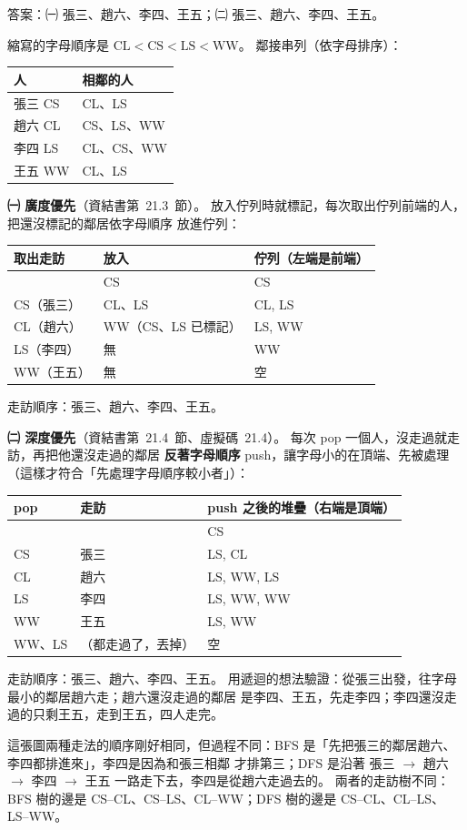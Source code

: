 \begin{pastsoln}
答案：㈠ 張三、趙六、李四、王五；㈡ 張三、趙六、李四、王五。

縮寫的字母順序是 $\mathrm{CL} < \mathrm{CS} < \mathrm{LS} < \mathrm{WW}$。 鄰接串列（依字母排序）：
\begin{center}
\begin{tabular}{ll}
\toprule
人 & 相鄰的人 \\
\midrule
張三 CS & CL、LS \\
趙六 CL & CS、LS、WW \\
李四 LS & CL、CS、WW \\
王五 WW & CL、LS \\
\bottomrule
\end{tabular}
\end{center}

\textbf{㈠ 廣度優先}（資結書第~21.3~節）。 放入佇列時就標記，每次取出佇列前端的人，把還沒標記的鄰居依字母順序
放進佇列：
\begin{center}
\begin{tabular}{lll}
\toprule
取出走訪 & 放入 & 佇列（左端是前端） \\
\midrule
& CS & CS \\
CS（張三） & CL、LS & CL, LS \\
CL（趙六） & WW（CS、LS 已標記） & LS, WW \\
LS（李四） & 無 & WW \\
WW（王五） & 無 & 空 \\
\bottomrule
\end{tabular}
\end{center}
走訪順序：張三、趙六、李四、王五。

\textbf{㈡ 深度優先}（資結書第~21.4~節、虛擬碼~21.4）。 每次 pop 一個人，沒走過就走訪，再把他還沒走過的鄰居
\textbf{反著字母順序} push，讓字母小的在頂端、先被處理（這樣才符合「先處理字母順序較小者」）：
\begin{center}
\begin{tabular}{lll}
\toprule
pop & 走訪 & push 之後的堆疊（右端是頂端） \\
\midrule
& & CS \\
CS & 張三 & LS, CL \\
CL & 趙六 & LS, WW, LS \\
LS & 李四 & LS, WW, WW \\
WW & 王五 & LS, WW \\
WW、LS & （都走過了，丟掉） & 空 \\
\bottomrule
\end{tabular}
\end{center}
走訪順序：張三、趙六、李四、王五。 用遞迴的想法驗證：從張三出發，往字母最小的鄰居趙六走；趙六還沒走過的鄰居
是李四、王五，先走李四；李四還沒走過的只剩王五，走到王五，四人走完。

這張圖兩種走法的順序剛好相同，但過程不同：BFS 是「先把張三的鄰居趙六、李四都排進來」，李四是因為和張三相鄰
才排第三；DFS 是沿著 張三 $\to$ 趙六 $\to$ 李四 $\to$ 王五 一路走下去，李四是從趙六走過去的。 兩者的走訪樹不同：
BFS 樹的邊是 CS–CL、CS–LS、CL–WW；DFS 樹的邊是 CS–CL、CL–LS、LS–WW。
\end{pastsoln}
